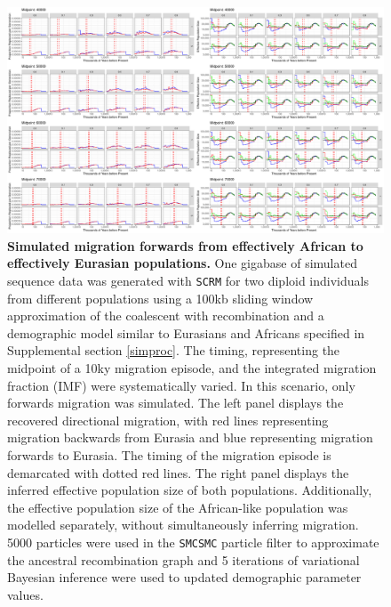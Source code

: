 \documentclass{article}
\begin{document}
\clearpage
\begin{figure}
	\centering
	\includegraphics[width=\textwidth]{plot/forward_different_starts.pdf}
	\caption{{\bf Simulated migration forwards from effectively African to effectively Eurasian populations.} One gigabase of simulated sequence data was generated with {\tt SCRM} for two diploid individuals from different populations using a 100kb sliding window approximation of the coalescent with recombination and a demographic model similar to Eurasians and Africans specified in Supplemental section \ref{simproc}. The timing, representing the midpoint of a 10ky migration episode, and the integrated migration fraction (IMF) were systematically varied. In this scenario, only forwards migration was simulated. The left panel displays the recovered directional migration, with red lines representing migration backwards from Eurasia and blue representing migration forwards to Eurasia. The timing of the migration episode is demarcated with dotted red lines. The right panel displays the inferred effective population size of both populations. Additionally, the effective population size of the African-like population was modelled separately, without simultaneously inferring migration. 5000 particles were used in the {\tt SMCSMC} particle filter to approximate the ancestral recombination graph and 5 iterations of variational Bayesian inference were used to updated demographic parameter values.}
	\label{fig:fwdsim}
\end{figure}
\end{document}
